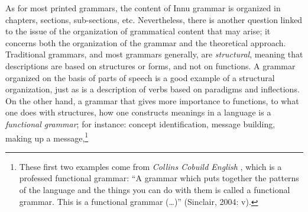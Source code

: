 As for most printed grammars, the content of Innu grammar is organized in chapters, sections, sub-sections, etc. Nevertheless, there is another question linked to the issue of the organization of grammatical content that may arise; it concerns both the organization of the grammar and the theoretical approach. Traditional grammars, and most grammars generally, are \textit{structural}, meaning that descriptions are based on structures or forms, and not on functions. A grammar organized on the basis of parts of speech is a good example of a structural organization, just as is a description of verbs based on paradigms and inflections. On the other hand, a grammar that gives more importance to functions, to what one does with structures, how one constructs meanings in a language is a \textit{functional grammar}; for instance: concept identification, message building, making up a message,\footnote{These
 first two examples come from \textit{Collins Cobuild English}  \citep{Sinclair2004}, which is a professed functional grammar: ``A grammar which puts together the patterns of the language and the things you can do with them is called a functional grammar. This is a functional grammar ({\dots})'' (Sinclair, 2004: v).
} 
